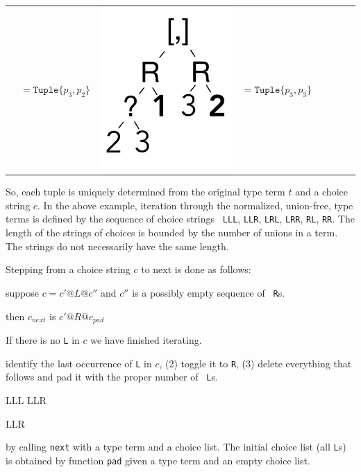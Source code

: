 \documentclass[a4paper,english]{lipics-v2019}
\newcommand{\xt}[1]{\texttt{#1}}
\newcommand{\tuple}[1]{\xt{Tuple\{}#1\xt{\}}}
\begin{document}
{\begin{tabular}{@{}l@{~}ll@{~}ll@{~}ll@{~}l}
\begin{minipage}{1.2cm}
\end{minipage} &  $ =   \tuple{p_3,p_2} $ 
&\begin{minipage}{1.2cm}\includegraphics[scale=.25]{figures/tree7.pdf} 
\end{minipage} &  $ =   \tuple{p_3,p_3} $ 
\end{tabular}}

\noindent 
So, each tuple is uniquely determined from the original type term $t$ and a
choice string $c$. In the above example, iteration through the normalized,
union-free, type terms is defined by the sequence of choice strings {\tt
  LLL}, {\tt LLR}, {\tt LRL}, {\tt LRR}, {\tt RL}, {\tt RR}. The length of
the strings of choices is bounded by the number of unions in a term.  The
strings do not necessarily have the same length.

Stepping from a choice string $c$ to next is done as follows:  

suppose $c = c' @ L @ c''$ and $c''$ is a possibly empty sequence of {\tt
  R}s.

then    $c_{next}$ is  $c' @ R @ c_{pad}$

If there is no {\tt L} in $c$ we have finished iterating.



identify the last occurrence of {\tt L} in $c$, (2) toggle it to {\tt R},
(3) delete everything that follows and pad it with the proper number of {\tt
  L}s.


LLL   LLR


LLR




by calling {\tt next} with a type term and a
choice list. The initial choice list (all {\tt L}s) is obtained by function
{\tt pad} given a type term and an empty choice list.
\end{document}
